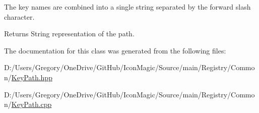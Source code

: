 The key names are combined into a single string separated by the forward slash character.

\begin{DoxyReturn}{Returns}
String representation of the path. 
\end{DoxyReturn}


The documentation for this class was generated from the following files\+:\begin{DoxyCompactItemize}
\item 
D\+:/\+Users/\+Gregory/\+One\+Drive/\+Git\+Hub/\+Icon\+Magic/\+Source/main/\+Registry/\+Common/\hyperlink{_key_path_8hpp}{Key\+Path.\+hpp}\item 
D\+:/\+Users/\+Gregory/\+One\+Drive/\+Git\+Hub/\+Icon\+Magic/\+Source/main/\+Registry/\+Common/\hyperlink{_key_path_8cpp}{Key\+Path.\+cpp}\end{DoxyCompactItemize}
